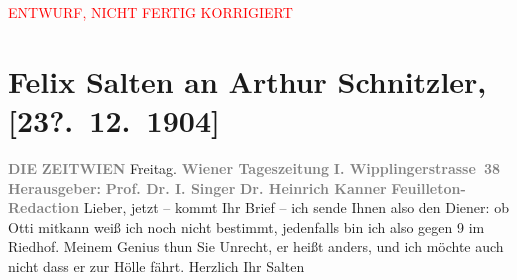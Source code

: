 
\begin{center}
            \textcolor{red}{ENTWURF, NICHT FERTIG KORRIGIERT}
                      \end{center}
            
         
         \renewcommand{\erwaehntePersonen}{Personen: Heinrich Kanner, Ottilie Salten, Isidor Singer}
         \renewcommand{\erwaehnteInstitutionen}{Institutionen: Die Zeit}
         \renewcommand{\erwaehnteOrte}{Orte: Riedhof, Wien, Wipplingerstraße}
         \renewcommand{\erwaehnteWerke}{}
               \section[Felix Salten an Arthur Schnitzler, {[}23?. 12. 1904{]}]{ Felix Salten an Arthur Schnitzler, {[}23?. 12. 1904{]}}\nopagebreak{}\rehead{ }\begin{ledgroupsized}[t]{13cm}\normalsize\beginnumbering \toendnotes[C]{\smallbreak\pagebreak[2]} 
\toendnotes[C]{\smallbreak}\pstart
           \noindent{}{\pb}\textcolor{gray}{\textbf{DIE}}\pend
           \pstart
           \textcolor{gray}{\textbf{ZEIT}}\hfill \textcolor{gray}{\textbf{WIEN}}{ }Freitag. \pend
           \pstart
           \textcolor{gray}{\textbf{Wiener Tageszeitung }}\hfill \textcolor{gray}{\textbf{I. Wipplingerstrasse 38}}\pend
           \pstart
           \textcolor{gray}{\textbf{Herausgeber: }}\pend
           \pstart
           \textcolor{gray}{\textbf{Prof. Dr. I. Singer}}\pend
           \pstart
           \textcolor{gray}{\textbf{Dr. Heinrich Kanner}}\pend
           \pstart
           \textcolor{gray}{\textbf{Feuilleton-Redaction}}\pend
           \pstart
           Lieber, jetzt – \label{K_L03404-1v}\label{K_L03404-1h} kommt Ihr
               Brief – ich sende Ihnen also den Diener: ob Otti mitkann weiß ich noch nicht bestimmt, jedenfalls bin ich also gegen 9
               im Riedhof. \pend
           \pstart
           Meinem Genius thun Sie Unrecht, er heißt anders, und ich möchte auch nicht dass er
               zur Hölle fährt. \pend
           \pstart Herzlich Ihr \spacefill\mbox{Salten }\pend{}
         

\end{ledgroupsized}
